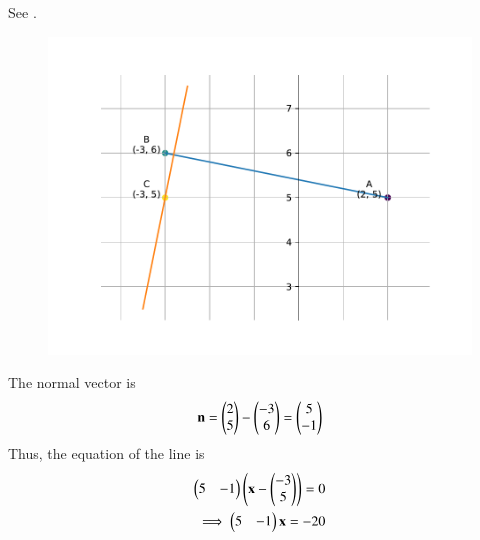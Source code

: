 See 
		.
	\begin{figure}[H]
		\centering
 \includegraphics[width=0.75\columnwidth]{chapters/11/10/2/10/figs/fig.pdf}
		\caption{}
		\label{fig:11/10/2/10}
  	\end{figure}
The normal vector is
\begin{align}
\mathbf{n} =\begin{pmatrix}2 \\5\end{pmatrix} -  \begin{pmatrix}-3 \\ 6\end{pmatrix} 
=\begin{pmatrix}
    5\\
    -1
\end{pmatrix}
\end{align}
Thus, the equation of the line is 
\begin{align}
\begin{pmatrix}
    5 &-1
	\end{pmatrix}\left(\mathbf{x} - \begin{pmatrix}-3 \\5\end{pmatrix}\right)
= 0
\\
\implies 
\begin{pmatrix}
    5 &-1
	\end{pmatrix}\mathbf{x} 
= -20
\end{align}
